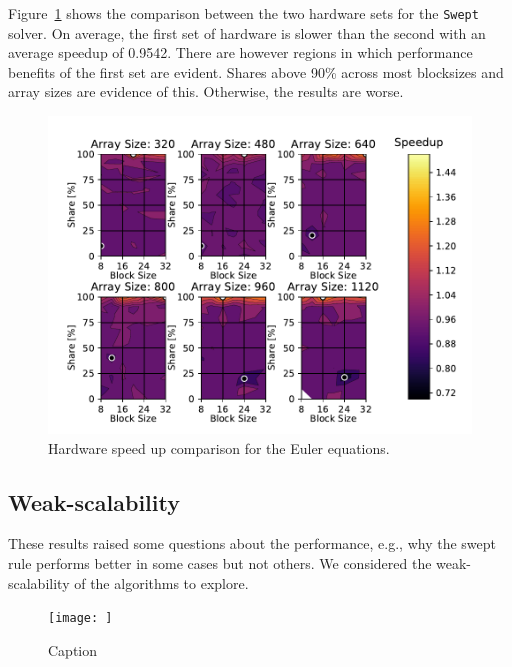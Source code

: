 \documentclass[review]{elsarticle}
\def\Swept{\texttt{Swept}}
\begin{document}
Figure~\ref{fig:eulerHardwareComp} shows the comparison between the two hardware sets for the \Swept{} solver. On average, the first set of hardware is slower than the second with an average speedup of 0.9542. There are however regions in which performance benefits of the first set are evident. Shares above 90\% across most blocksizes and array sizes are evidence of this. Otherwise, the results are worse. 

\begin{figure}[htb!]
    \centering
    \includegraphics[scale=0.7]{figs/hardwareSpeedUpeuler.pdf}
    \caption{Hardware speed up comparison for the Euler equations.}
    \label{fig:eulerHardwareComp}
\end{figure}

\subsection{Weak-scalability}
These results raised some questions about the performance, e.g., why the swept rule performs better in some cases but not others. We considered the weak-scalability of the algorithms to explore.
\begin{figure}
    \centering
    \texttt{[image: ]}
    \caption{Caption}
    \label{fig:my_label}
\end{figure}
\end{document}
